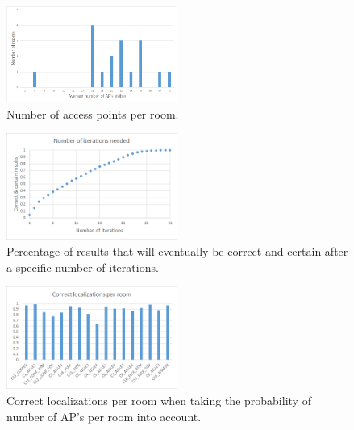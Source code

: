 \documentclass[a4paper,10pt,twoside]{IEEEtran}
\begin{document}
\begin{figure}[h!]
  \centering
    \includegraphics[width=0.5\textwidth]{graph-numberAPperRoom}
    \caption{Number of access points per room.}
    \label{fig:graph-numberAPperRoom}
\end{figure}

\begin{figure}[h!]
  \centering
    \includegraphics[width=0.5\textwidth]{iterations_needed}
    \caption{Percentage of results that will eventually be correct and certain after a specific number of iterations.}
    \label{fig:iterations-needed}
\end{figure}

\begin{figure}[h!]
  \centering
    \includegraphics[width=0.5\textwidth]{correctness_perroom}
    \caption{Correct localizations per room when taking the probability of number of AP's per room into account.}
    \label{fig:correctness-perroom}
\end{figure}
\end{document}
